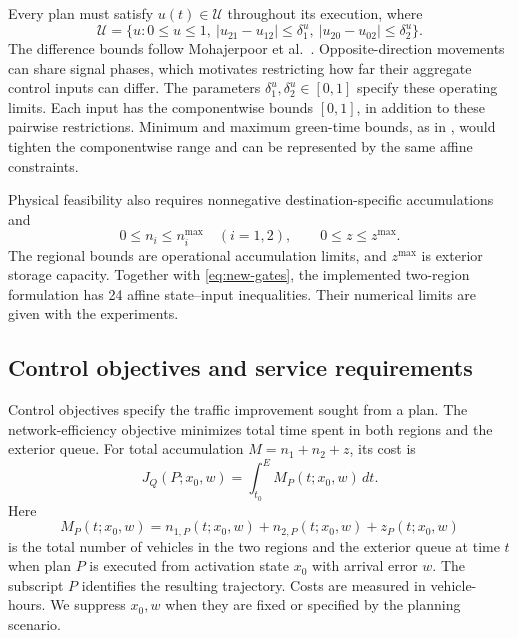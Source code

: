 \documentclass[preprint,12pt]{elsarticle}
\theoremstyle{definition}
\theoremstyle{plain}
\theoremstyle{definition}
\theoremstyle{plain}
\begin{document}
Every plan must satisfy $u(t)\in\mathcal U$ throughout its execution,
where
\begin{equation}
\mathcal U=\{u:0\le u\le1,\ |u_{21}-u_{12}|\le\delta_1^u,
\ |u_{20}-u_{02}|\le\delta_2^u\}.
\label{eq:new-gates}
\end{equation}
The difference bounds follow Mohajerpoor et al.~\cite{mohajerpoor2020hinf}. Opposite-direction
movements can share signal phases, which motivates restricting how far
their aggregate control inputs can differ. The parameters
$\delta_1^u,\delta_2^u\in[0,1]$ specify these operating limits. Each input has the componentwise bounds $[0,1]$, in addition to these
pairwise restrictions. Minimum and maximum green-time bounds, as in
\cite{mohajerpoor2020hinf}, would tighten the componentwise range and
can be represented by the same affine constraints.

Physical feasibility also requires nonnegative destination-specific
accumulations and
\[
0\le n_i\le n_i^{\max}\quad(i=1,2),\qquad 0\le z\le z^{\max}.
\]
The regional bounds are operational accumulation limits, and $z^{\max}$
is exterior storage capacity. Together with \eqref{eq:new-gates}, the
implemented two-region formulation has 24 affine state--input
inequalities. Their numerical limits are given with the experiments.

\subsection{Control objectives and service requirements}
\label{sec:benchmark-formulation}

Control objectives specify the traffic improvement sought from a plan.
The network-efficiency objective minimizes total time spent in both
regions and the exterior queue. For total accumulation
$M=n_1+n_2+z$, its cost is
\begin{equation}
J_Q(P;x_0,w)=\int_{t_0}^{E}M_P(t;x_0,w)\,dt.
\label{eq:benchmark-queue-cost}
\end{equation}
Here
\[
M_P(t;x_0,w)=n_{1,P}(t;x_0,w)+n_{2,P}(t;x_0,w)+z_P(t;x_0,w)
\]
is the total number of vehicles in the two regions and the exterior queue
at time $t$ when plan $P$ is executed from activation state $x_0$ with
arrival error $w$. The subscript $P$ identifies the resulting trajectory.
Costs are measured in vehicle-hours. We suppress $x_0,w$ when they are
fixed or specified by the planning scenario.
\end{document}
